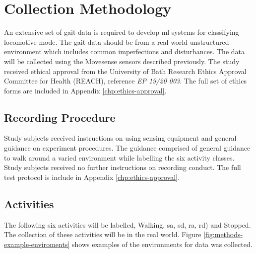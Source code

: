 \section{Collection Methodology}
\label{sec:methods-data-collection}
An extensive set of gait data is required to develop \acrshort{ml} systems for classifying locomotive mode. The gait data should be from a real-world unstructured environment which includes common imperfections and disturbances. The data will be collected using the Movesense sensors described previously. The study received ethical approval from the University of Bath Research Ethics Approval Committee for Health (REACH), reference \textit{EP 19/20 003}. The full set of ethics forms are included in Appendix \ref{chp:ethics-approval}.

\subsection{Recording Procedure}
Study subjects received instructions on using sensing equipment and general guidance on experiment procedures. The guidance comprised of general guidance to walk around a varied environment while labelling the six activity classes. Study subjects received no further instructions on recording conduct. The full test protocol is include in Appendix \ref{chp:ethics-approval}.

\subsection{Activities}
The following six activities will be labelled, Walking, \acrfull{sa}, \acrfull{sd}, \acrfull{ra}, \acrfull{rd}) and Stopped. The collection of these activities will be in the real world. Figure \ref{fig:methods-example-enviroments} shows examples of the environments for data was collected.

